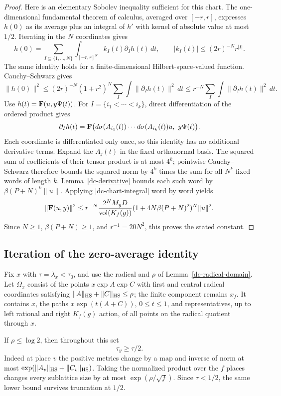 \begin{proof}
Here is an elementary Sobolev inequality sufficient
for this chart.  The one-dimensional fundamental
theorem of calculus, averaged over \([-r,r]\),
expresses \(h(0)\) as its average plus an integral
of \(h'\) with kernel of absolute value at most
\(1/2\).  Iterating in the \(N\) coordinates gives
\[
 h(0)=\sum_{I\subseteq\{1,\ldots,N\}}
          \int_{[-r,r]^N}k_I(t)\partial_Ih(t)\,dt,
 \qquad |k_I(t)|\le(2r)^{-N}r^{|I|}.
\]
The same identity holds for a finite-dimensional
Hilbert-space-valued function.  Cauchy--Schwarz gives
\[
 \|h(0)\|^2\le(2r)^{-N}(1+r^2)^N
                     \sum_I\int\|\partial_Ih(t)\|^2\,dt
              \le r^{-N}\sum_I\int\|\partial_Ih(t)\|^2\,dt.
\]
Use \(h(t)={\bf F}(u,y\Psi(t))\).
For \(I=\{i_1<\cdots<i_k\}\), direct differentiation
of the ordered product gives
\[
 \partial_Ih(t)=
 {\bf F}\bigl(d\sigma(A_{i_1}(t))\cdots
                       d\sigma(A_{i_k}(t))u,\ y\Psi(t)\bigr).
\]
Each coordinate is differentiated only once, so this
identity has no additional derivative terms.
Expand the \(A_j(t)\) in the fixed orthonormal basis.
The squared sum of coefficients of their tensor
product is at most \(4^k\); pointwise Cauchy--Schwarz
therefore bounds the squared norm by \(4^k\) times
the sum for all \(N^k\) fixed words of length \(k\).
Lemma~\ref{dc-derivative} bounds each such word by
\(\beta(P+N)^k\|u\|\).
Applying \eqref{dc-chart-integral} word by word yields
\[
 \|{\bf F}(u,y)\|^2
 \le r^{-N}\frac{2^NM_yD}{\operatorname{vol}(K_f(g))}
                 (1+4N\beta(P+N)^2)^N\|u\|^2.
\]
Since \(N\ge1\), \(\beta(P+N)\ge1\), and
\(r^{-1}=20N^2\), this proves the stated constant.
\end{proof}

\subsection{Iteration of the zero-average identity}

Fix \(x\) with \(\tau=\lambda_x<\tau_0\), and use the
radical and \(\rho\) of Lemma~\ref{dc-radical-domain}.
Let \(\Omega_x\) consist of the points
\(x\exp A\exp C\) with first and central radical
coordinates satisfying
\(\|A\|_{\rm HS}+\|C\|_{\rm HS}\le\rho\);
the finite component remains \(x_f\).
It contains \(x\), the paths
\(x\exp(t(A+C))\), \(0\le t\le1\), and representatives,
up to left rational and right \(K_f(g)\) action,
of all points on the radical quotient through \(x\).

If \(\rho\le\log2\), then throughout this set
\begin{equation}\label{dc-size-nearby}
                   \tau_y\ge\tau/2.
\end{equation}
Indeed at place \(v\) the positive metrics change
by a map and inverse of norm at most
\(\exp(\|A_v\|_{\rm HS}+\|C_v\|_{\rm HS})\).
Taking the normalized product over the \(f\) places
changes every sublattice size by at most
\(\exp(\rho/\sqrt f)\).  Since \(\tau<1/2\),
the same lower bound survives truncation at \(1/2\).

